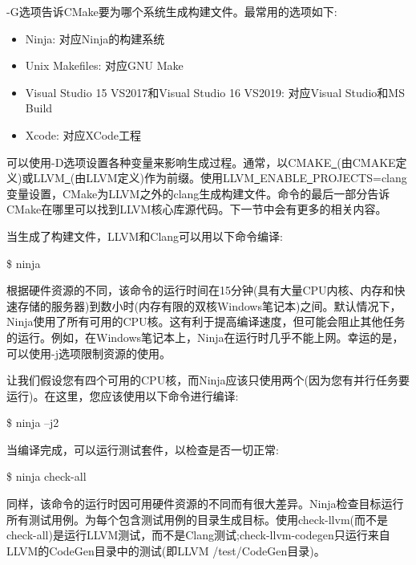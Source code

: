 -G选项告诉CMake要为哪个系统生成构建文件。最常用的选项如下:\par

\begin{itemize}
	\item Ninja: 对应Ninja的构建系统
	\item Unix Makefiles: 对应GNU Make
	\item Visual Studio 15 VS2017和Visual Studio 16 VS2019: 对应Visual Studio和MS Build
	\item Xcode: 对应XCode工程
\end{itemize}

可以使用-D选项设置各种变量来影响生成过程。通常，以CMAKE\underline{~}(由CMAKE定义)或LLVM\underline{~}(由LLVM定义)作为前缀。使用LLVM\underline{~}ENABLE\underline{~}PROJECTS=clang变量设置，CMake为LLVM之外的clang生成构建文件。命令的最后一部分告诉CMake在哪里可以找到LLVM核心库源代码。下一节中会有更多的相关内容。\par

当生成了构建文件，LLVM和Clang可以用以下命令编译:\par

\begin{tcolorbox}[colback=white,colframe=black]
	\$ ninja
\end{tcolorbox}

根据硬件资源的不同，该命令的运行时间在15分钟(具有大量CPU内核、内存和快速存储的服务器)到数小时(内存有限的双核Windows笔记本)之间。默认情况下，Ninja使用了所有可用的CPU核。这有利于提高编译速度，但可能会阻止其他任务的运行。例如，在Windows笔记本上，Ninja在运行时几乎不能上网。幸运的是，可以使用-j选项限制资源的使用。\par

让我们假设您有四个可用的CPU核，而Ninja应该只使用两个(因为您有并行任务要运行)。在这里，您应该使用以下命令进行编译:\par

\begin{tcolorbox}[colback=white,colframe=black]
	\$ ninja –j2
\end{tcolorbox}

当编译完成，可以运行测试套件，以检查是否一切正常:\par

\begin{tcolorbox}[colback=white,colframe=black]
	\$ ninja check-all
\end{tcolorbox}

同样，该命令的运行时因可用硬件资源的不同而有很大差异。Ninja检查目标运行所有测试用例。为每个包含测试用例的目录生成目标。使用check-llvm(而不是check-all)是运行LLVM测试，而不是Clang测试;check-llvm-codegen只运行来自LLVM的CodeGen目录中的测试(即LLVM /test/CodeGen目录)。\par

